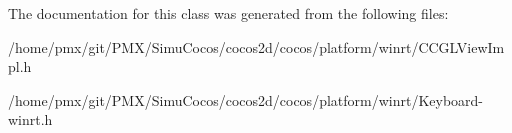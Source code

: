 The documentation for this class was generated from the following files\+:\begin{DoxyCompactItemize}
\item 
/home/pmx/git/\+P\+M\+X/\+Simu\+Cocos/cocos2d/cocos/platform/winrt/C\+C\+G\+L\+View\+Impl.\+h\item 
/home/pmx/git/\+P\+M\+X/\+Simu\+Cocos/cocos2d/cocos/platform/winrt/Keyboard-\/winrt.\+h\end{DoxyCompactItemize}
